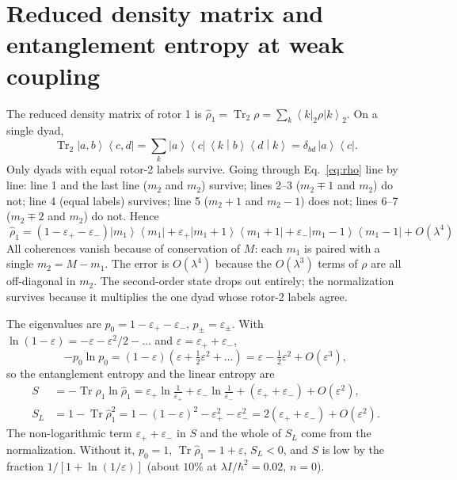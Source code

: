 \documentclass[aps,pra,onecolumn,notitlepage,nofootinbib,11pt]{revtex4-2}
\newcommand{\Tr}{\operatorname{Tr}}
\newcommand{\ket}[1]{\left|#1\right\rangle}
\newcommand{\bra}[1]{\left\langle#1\right|}
\newcommand{\braket}[2]{\left\langle#1\middle|#2\right\rangle}
\newcommand{\ketbra}[2]{\left|#1\right\rangle\!\left\langle#2\right|}
\newcommand{\epsp}{\varepsilon_{+}}
\newcommand{\epsm}{\varepsilon_{-}}
\begin{document}
\section{Reduced density matrix and entanglement entropy at weak coupling}

The reduced density matrix of rotor 1 is $\hat\rho_{1}=\Tr_{2}\rho=\sum_{k}
\bra{k}_{2}\rho\ket{k}_{2}$. On a single dyad,
\begin{equation}
\Tr_{2}\ketbra{a,b}{c,d}=\sum_{k}\ket a\bra c\,\braket kb\braket dk=\delta_{bd}\,\ketbra ac .
\label{eq:ptrace}
\end{equation}
Only dyads with equal rotor-2 labels survive. Going through Eq.~\eqref{eq:rho} line by
line: line 1 and the last line ($m_{2}$ and $m_{2}$) survive; lines 2--3 ($m_{2}\mp1$
and $m_{2}$) do not; line 4 (equal labels) survives; line 5 ($m_{2}+1$ and $m_{2}-1$)
does not; lines 6--7 ($m_{2}\mp2$ and $m_{2}$) do not. Hence
\begin{equation}
\boxed{\;
\hat\rho_{1}=\left(1-\epsp-\epsm\right)\ketbra{m_{1}}{m_{1}}
+\epsp\ketbra{m_{1}+1}{m_{1}+1}+\epsm\ketbra{m_{1}-1}{m_{1}-1}+O(\lambda^{4})\;}
\label{eq:rho1}
\end{equation}
All coherences vanish because of conservation of $M$: each $m_{1}$ is paired with a
single $m_{2}=M-m_{1}$. The error is $O(\lambda^{4})$ because the $O(\lambda^{3})$ terms
of $\rho$ are all off-diagonal in $m_{2}$. The second-order state drops out entirely;
the normalization survives because it multiplies the one dyad whose rotor-2 labels
agree.

The eigenvalues are $p_{0}=1-\epsp-\epsm$, $p_{\pm}=\varepsilon_{\pm}$. With
$\ln(1-\varepsilon)=-\varepsilon-\varepsilon^{2}/2-\dots$ and $\varepsilon=\epsp+\epsm$,
\begin{equation}
-p_{0}\ln p_{0}=(1-\varepsilon)\left(\varepsilon+\tfrac12\varepsilon^{2}+\dots\right)
=\varepsilon-\tfrac12\varepsilon^{2}+O(\varepsilon^{3}),
\end{equation}
so the entanglement entropy and the linear entropy are
\begin{align}
S&=-\Tr\hat\rho_{1}\ln\hat\rho_{1}=\epsp\ln\frac{1}{\epsp}+\epsm\ln\frac{1}{\epsm}
+(\epsp+\epsm)+O(\varepsilon^{2}),\label{eq:Sweak}\\
S_{L}&=1-\Tr\hat\rho_{1}^{2}=1-(1-\varepsilon)^{2}-\epsp^{2}-\epsm^{2}
=2(\epsp+\epsm)+O(\varepsilon^{2}).\label{eq:SL}
\end{align}
The non-logarithmic term $\epsp+\epsm$ in $S$ and the whole of $S_{L}$ come from the
normalization. Without it, $p_{0}=1$, $\Tr\hat\rho_{1}=1+\varepsilon$, $S_{L}<0$, and
$S$ is low by the fraction $1/[1+\ln(1/\varepsilon)]$ (about $10\%$ at
$\lambda I/\hbar^{2}=0.02$, $n=0$).
\end{document}
